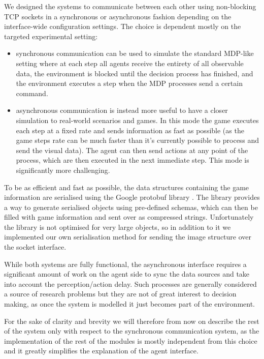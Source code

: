 We designed the systems to communicate between each other using non-blocking TCP
sockets in a synchronous or asynchronous fashion depending on the interface-wide
configuration settings. The choice is dependent mostly on the targeted
experimental setting:

\begin{itemize}
\item synchronous communication can be used to simulate the standard MDP-like
  setting where at each step all agents receive the entirety of all observable
  data, the environment is blocked until the decision process has finished, and
  the environment executes a step when the MDP processes send a certain command.
\item asynchronous communication is instead more useful to have a closer
  simulation to real-world scenarios and games. In this mode the game executes
  each step at a fixed rate and sends information as fast as possible (as the
  game steps rate can be much faster than it's currently possible to process and
  send the visual data). The agent can then send actions at any point of the
  process, which are then executed in the next immediate step.
  This mode is significantly more challenging.
\end{itemize}

To be as efficient and fast as possible, the data structures containing the game
information are serialised using the Google protobuf library
\citep{varda2008protocol}. The library provides a way to generate serialised
objects using pre-defined schemas, which can then be filled with game
information and sent over as compressed strings. Unfortunately the library is
not optimised for very large objects, so in addition to it we implemented our
own serialisation method for sending the image structure over the socket
interface.

While both systems are fully functional, the asynchronous interface requires a
significant amount of work on the agent side to sync the data sources and take
into account the perception/action delay. Such processes are generally
considered a source of research problems but they are not of great interest to
decision making, as once the system is modelled it just becomes part of the
environment.

For the sake of clarity and brevity we will therefore from now on describe the
rest of the system only with respect to the synchronous communication system, as
the implementation of the rest of the modules is mostly independent from this
choice and it greatly simplifies the explanation of the agent interface.

